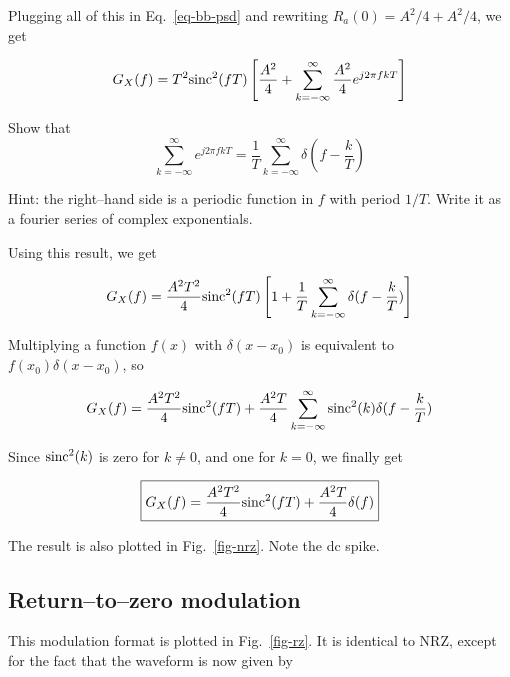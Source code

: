 Plugging all of this in Eq.~\ref{eq-bb-psd} and rewriting $R_a(0) = A^2/4 + A^2/4$, we get

\begin{equation}
G_X(f) =  T^2 {\rm sinc}^2 (f T) \left [ \frac{A^2}{4} + \sum_{k=-\infty}^{\infty} \frac{A^2}{4}  e^{j 2 \pi f k T} \right ]
\end{equation} 

\begin{sidebar}
\begin{ex}
Show that 
$$\sum_{k=-\infty}^{\infty}  e^{j 2 \pi f k T} = \frac{1}{T} \sum_{k=-\infty}^{\infty} \delta(f-\frac{k}{T})$$

Hint: the right--hand side is a periodic function in $f$ with period $1/T$. Write it as a fourier series of complex exponentials.
\end{ex}
\end{sidebar}

Using this result, we get

\begin{equation}
G_X(f) =  \frac{A^2 T^2}{4} {\rm sinc}^2 (f T) \left [ 1 + \frac{1}{T} \sum_{k=-\infty}^{\infty} \delta(f-\frac{k}{T}) \right ] \label{eq-nrz}
\end{equation} 

Multiplying a function $f(x)$  with $\delta(x-x_0)$ is equivalent to $f(x_0)\delta(x-x_0)$, so

\begin{equation}
G_X(f) =  \frac{A^2 T^2}{4} {\rm sinc}^2 (f T)  + \frac{A^2T}{4} \sum_{k=-\infty}^{\infty} {\rm sinc}^2 (k)  \delta(f-\frac{k}{T}) 
\end{equation} 

Since ${\rm sinc}^2 (k)$ is zero for $k \ne 0$, and one for $k=0$, we finally get

\begin{equation}
\fbox{$\displaystyle
G_X(f) =  \frac{A^2 T^2}{4} {\rm sinc}^2 (f T)  + \frac{A^2T}{4} \delta(f)
$}
\end{equation} 

The result is also plotted in Fig.~\ref{fig-nrz}. Note the dc spike.

\subsection{Return--to--zero modulation}

This modulation format is plotted in Fig.~\ref{fig-rz}. It is identical to NRZ, except for the fact that the waveform is now given by

